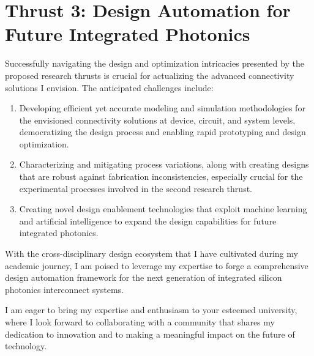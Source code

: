 \section{Thrust 3: Design Automation for Future Integrated Photonics}
Successfully navigating the design and optimization intricacies presented by the proposed research thrusts is crucial for actualizing the advanced connectivity solutions I envision. The anticipated challenges include:
\begin{enumerate}[nosep]
    \item Developing efficient yet accurate modeling and simulation methodologies for the envisioned connectivity solutions at device, circuit, and system levels, democratizing the design process and enabling rapid prototyping and design optimization.
    \item Characterizing and mitigating process variations, along with creating designs that are robust against fabrication inconsistencies, especially crucial for the experimental processes involved in the second research thrust.
    \item Creating novel design enablement technologies that exploit machine learning and artificial intelligence to expand the design capabilities for future integrated photonics.
\end{enumerate}
With the cross-disciplinary design ecosystem that I have cultivated during my academic journey\cite{wangDispersionEngineeredFabricationRobustSOI2023}\cite{wangCharacterizationApplicationsSpatial2020}\cite{wangEnergyEfficiencyYield2021}, I am poised to leverage my expertise to forge a comprehensive design automation framework for the next generation of integrated silicon photonics interconnect systems.




I am eager to bring my expertise and enthusiasm to your esteemed university, where I look forward to collaborating with a community that shares my dedication to innovation and to making a meaningful impact on the future of technology.

